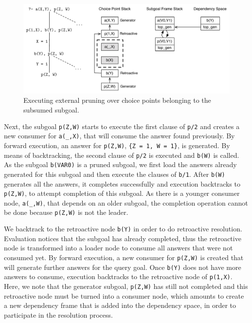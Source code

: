 \begin{figure}[ht]
  \centering
    \includegraphics[scale=0.5]{retro_example3.pdf}
  \caption{Executing external pruning over choice points belonging to the subsumed subgoal.}
  \label{fig:retro_eval3}
\end{figure}

Next, the subgoal \texttt{p(Z,W)} starts to execute the first clause of \texttt{p/2} and creates
a new consumer for \texttt{a(\_,X)}, that will consume the answer found previously. By forward execution, an answer
for \texttt{p(Z,W)}, \texttt{\{Z~=~1,~W~=~1\}}, is generated. By means of backtracking, the second
clause of \texttt{p/2} is executed and \texttt{b(W)} is called. As the subgoal \texttt{b(VAR0)} is a pruned subgoal,
we first load the answers already generated for this subgoal and then execute the clauses of \texttt{b/1}.
After \texttt{b(W)} generates all the answers, it completes successfully and execution backtracks to
\texttt{p(Z,W)}, to attempt completion of this subgoal. As there is a younger consumer node, \texttt{a(\_,W)},
that depends on an older subgoal, the completion operation cannot be done because \texttt{p(Z,W)} is not the leader.

We backtrack to the retroactive node \texttt{b(Y)} in order to do retroactive resolution. Evaluation
notices that the subgoal has already completed, thus the retroactive node is transformed into a loader node
to consume all answers that were not consumed yet. By forward execution, a new consumer for \texttt{p(Z,W)} is
created that will generate further answers for the query goal. Once \texttt{b(Y)} does not have more answers
to consume, execution backtracks to the retroactive node of \texttt{p(1,X)}. Here, we note that
the generator subgoal, \texttt{p(Z,W)} has still not completed and this retroactive node must be turned
into a consumer node, which amounts to create a new dependency frame that is added into the dependency space,
in order to participate in the resolution process.

